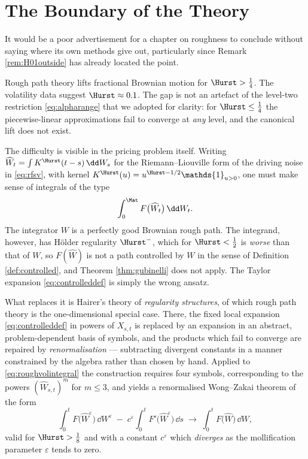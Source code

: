 \section{The Boundary of the Theory}\label{sec:beyond}

It would be a poor advertisement for a chapter on roughness to conclude without saying where its
own methods give out, particularly since Remark \ref{rem:H01outside} has already located the point.

Rough path theory lifts fractional Brownian motion for $\Hurst > \tfrac14$. The volatility data
suggest $\Hurst \approx 0.1$. The gap is not an artefact of the level-two restriction
\eqref{eq:alpharange} that we adopted for clarity: for $\Hurst \leq \tfrac14$ the piecewise-linear
approximations fail to converge at \emph{any} level, and the canonical lift does not exist.

The difficulty is visible in the pricing problem itself. Writing $\widehat W_t = \int K^{\Hurst}(t-s)\,\dd W_s$
for the Riemann--Liouville form of the driving noise in \eqref{eq:rfsv}, with kernel
$K^{\Hurst}(u) = u^{\Hurst - 1/2}\mathds{1}_{u>0}$, one must make sense of integrals of the type
\begin{equation}\label{eq:roughvolintegral}
\int_0^{\Mat} F\bigl(\widehat W_t\bigr)\,\dd W_t .
\end{equation}
The integrator $W$ is a perfectly good Brownian rough path. The integrand, however, has Hölder
regularity $\Hurst^{-}$, which for $\Hurst<\tfrac12$ is \emph{worse} than that of $W$, so
$F(\widehat W)$ is not a path controlled by $W$ in the sense of Definition \ref{def:controlled}, and
Theorem \ref{thm:gubinelli} does not apply. The Taylor expansion \eqref{eq:controlleddef} is simply
the wrong ansatz.

What replaces it is Hairer's theory of \emph{regularity structures}, of which rough path theory is
the one-dimensional special case. There, the fixed local expansion \eqref{eq:controlleddef} in
powers of $X_{s,t}$ is replaced by an expansion in an abstract, problem-dependent basis of symbols,
and the products which fail to converge are repaired by \emph{renormalisation} --- subtracting
divergent constants in a manner constrained by the algebra rather than chosen by hand. Applied to
\eqref{eq:roughvolintegral} the construction requires four symbols, corresponding to the powers
$(\widehat W_{s,t})^m$ for $m \leq 3$, and yields a renormalised Wong--Zakai theorem of the form
\begin{equation}\label{eq:renormalisedwz}
\int_0^t F\bigl(\widehat W^{\varepsilon}\bigr)\,\dd W^{\varepsilon} \;-\; c^{\varepsilon}\!\int_0^t F'\bigl(\widehat W^{\varepsilon}\bigr)\,\dd s
\;\longrightarrow\; \int_0^t F\bigl(\widehat W\bigr)\,\dd W ,
\end{equation}
valid for $\Hurst > \tfrac18$ and with a constant $c^\varepsilon$ which \emph{diverges} as the
mollification parameter $\varepsilon$ tends to zero.

